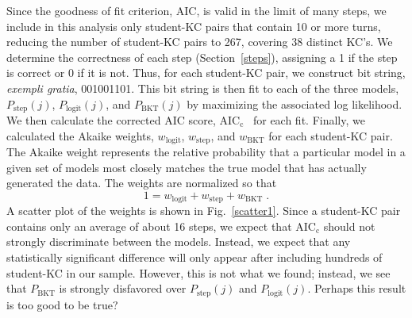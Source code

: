 \documentclass[11pt,letterpaper]{article}
\begin{document}
Since the goodness of fit criterion, AIC, is valid in the limit 
of many steps, we include in this analysis only student-KC 
pairs that contain 10 or more turns, reducing the number of 
student-KC pairs to 267, covering 38 distinct KC's.
We determine the correctness of each step (Section~\ref{steps}),
assigning a 1 if the step is correct or 0 if it is not.
Thus, for each student-KC pair, we construct bit string, {\em exempli gratia},
001001101.  This bit string is then fit to each of the three models,
$P_\mathrm{step}(j)$, $P_\mathrm{logit}(j)$, and $P_\mathrm{BKT}(j)$ by
maximizing the associated log likelihood.  
We then calculate the corrected AIC score, AIC$_\mathrm{c}$~\cite{aicbook} 
for each fit.  
Finally, we calculated the Akaike weights, $w_\mathrm{logit}$,
$w_\mathrm{step}$, and $w_\mathrm{BKT}$ for each student-KC pair.  
The Akaike weight represents the relative probability that
a particular model in a given set of models most closely matches
the true model that has actually generated the data.
The weights are normalized so that 
%
\begin{equation}
   1=w_\mathrm{logit}+ w_\mathrm{step} + w_\mathrm{BKT} \; .
\end{equation}
%
A scatter plot of the weights is shown in Fig.~\ref{scatter1}.
Since a student-KC pair contains only an average of about 16 steps, we 
expect that AIC$_\mathrm{c}$ should not strongly
discriminate between the models.  Instead, we expect that
any statistically significant difference will only appear 
after including hundreds of student-KC in our sample.  However, 
this is not what we found; instead, we see that $P_\mathrm{BKT}$ is 
strongly disfavored over $P_\mathrm{step}(j)$ and $P_\mathrm{logit}(j)$.
Perhaps this result is too good to be true?
\end{document}
